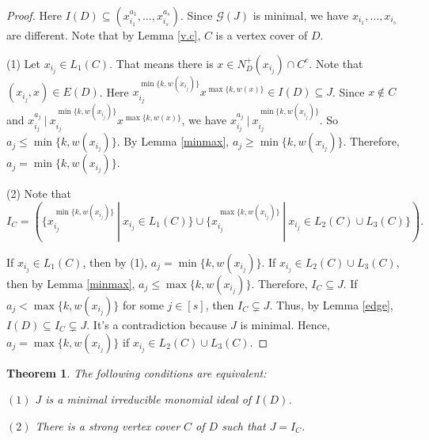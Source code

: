 \documentclass[11pt,reqno]{amsart}
\newtheorem{theorem}{Theorem}[section]
\theoremstyle{definition}
\begin{document}
\begin{proof}
Here $I(D)  \subseteq   (x^{a_1}_
{i_1} ,\ldots, x^{a_s}_
{i_s})$. Since $\mathcal{G}(J)$ is minimal, we have $ x_{i_1} , \ldots , x_{i_s} $ are different. Note that by Lemma \ref{v.c}, $C$ is a vertex cover of $D$. 
	
	(1)  Let $  x_{i_j} \in  L_1(C) $. That means there is $x \in N_D^+(x_{i_j} )  \cap  C^c$.  Note that $(x_{i_j}, x  )  \in E(D)$. Here     $x_{i_j}^{\min\{k,w(x_{i_j})\}} x^{\max\{k,w(x)\}} \in I(D) \subseteq  J   $.    Since  $x \notin C$ and    $ x^{a_j}_
	{i_j}  ~|~       x_{i_j}^{\min\{k,w(x_{i_j})\}} x^{\max\{k,w(x)\}}    $, we have   $ x^{a_j}_
	{i_j}  ~|~       x_{i_j}^{\min\{k,w(x_{i_j})\}}    $.  So  $ {a_j}
 \leq       {\min\{k,w(x_{i_j})\}}    $.     
By Lemma \ref{minmax},  $ {a_j}
\geq       {\min\{k,w(x_{i_j})\}}    $. Therefore, $ {a_j}
=    {\min\{k,w(x_{i_j})\}}    $.  


(2) Note that  $$I_C  =  ( \{x_{i_j}^{\min\{k, w(x_{i_j})\}}~|~x_{i_j} \in L_1(C)   \}    \cup    \{x_{i_j}^{\max\{k, w(x_{i_j})\}}~|~x_{i_j} \in  L_2(C) \cup L_3(C) \} ).$$

If $x_{i_j} \in L_1(C)  $, then by (1), $ {a_j}
=    {\min\{k,w(x_{i_j})\}}    $.
If  $x_{i_j} \in  L_2(C) \cup L_3(C)  $,  then by Lemma \ref{minmax},  $ {a_j}
\leq       \max\{k,w(x_{i_j})\}   $. Therefore,    $ I_C \subseteq J$.  If  $ {a_j}
<       {\max\{k,w(x_{i_j})\}}    $ for some $j \in [s]$, then $ I_C \subsetneq J$.
Thus, by Lemma \ref{edge}, $I(D)  \subseteq I_C \subsetneq J$. It's a contradiction because $J$ is minimal. Hence, $a_j ={\max\{k, w(x_{i_j})\}}$ if $x_{i_j} \in  L_2(C) \cup L_3(C)  $.    
\end{proof}


\begin{theorem}\label{minimal-j}
The following conditions are equivalent:


$ (1) $ $ J $ is a minimal irreducible monomial ideal of $ I(D) $.


$ (2) $ There is a strong vertex cover $ C $ of $ D $ such that $ J = I_C $.
\end{theorem}
\end{document}
